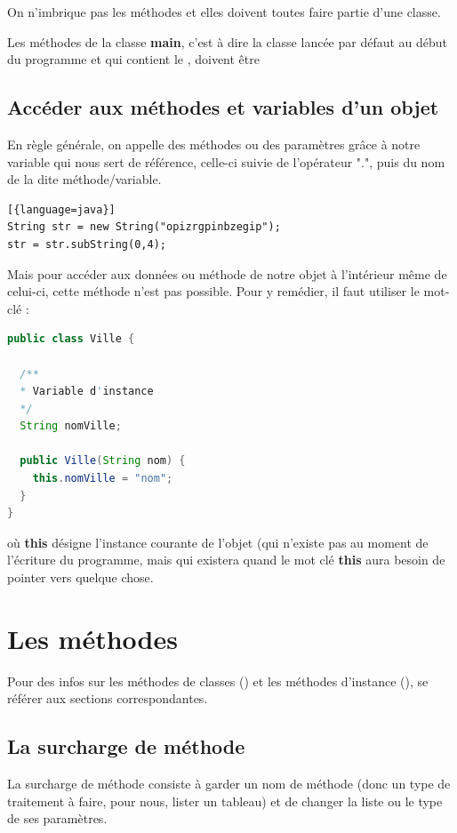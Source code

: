 \documentclass[a4paper,twoside]{article}
\begin{document}
\bigskip

\begin{remarque}
On n'imbrique pas les méthodes et elles doivent toutes faire partie d'une classe. 
\end{remarque}

\begin{attention}
Les méthodes de la classe \textbf{main}, c'est à dire la classe lancée par défaut au début du programme et qui contient le , doivent être 
\end{attention}

\subsection{Accéder aux méthodes et variables d'un objet}
En règle générale, on appelle des méthodes ou des paramètres grâce à notre variable qui nous sert de référence, celle-ci suivie de l'opérateur ".", puis du nom de la dite méthode/variable.
\begin{lstlisting}[{language=java}]
String str = new String("opizrgpinbzegip");
str = str.subString(0,4);
\end{lstlisting}

Mais pour accéder aux données ou méthode de notre objet à l'intérieur même de celui-ci, cette méthode n'est pas possible. Pour y remédier, il faut utiliser le mot-clé  :
\begin{lstlisting}[language=java]
public class Ville {
  
  /**
  * Variable d'instance
  */
  String nomVille;
  
  public Ville(String nom) {
    this.nomVille = "nom";
  }
}
\end{lstlisting}
où \textbf{this} désigne l'instance courante de l'objet (qui n'existe pas au moment de l'écriture du programme, mais qui existera quand le mot clé \textbf{this} aura besoin de pointer vers quelque chose. 


\section{Les méthodes}
Pour des infos sur les méthodes de classes () et les méthodes d'instance (), se référer aux sections correspondantes.
\subsection{La surcharge de méthode}\label{sec:surcharge}
La surcharge de méthode consiste à garder un nom de méthode (donc un type de traitement à faire, pour nous, lister un tableau) et de changer la liste ou le type de ses paramètres.
\end{document}
